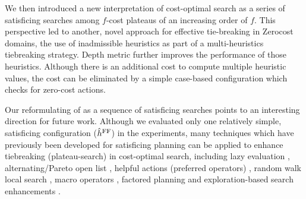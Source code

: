 We then introduced a new interpretation of cost-optimal \astar search as a series of satisficing
       searches among $f$-cost plateaus of an increasing order of $f$. 
This perspective led to another, novel approach for effective tie-breaking in Zerocost domains, the use of
       inadmissible heuristics as part of a multi-heuristics tiebreaking strategy.
       Depth metric further improves the performance of those
       heuristics. Although there is an additional cost to compute
       multiple heuristic values, the cost can be eliminated by a simple
       case-based configuration which checks for zero-cost actions.

Our reformulating of \astar as a sequence of satisficing searches  points to  an interesting direction for future work.
Although we evaluated only one relatively simple, satisficing configuration ($\hat{h}^{\text{FF}}$) in
the experiments, many techniques which have previously been developed for satisficing planning can be applied to enhance tiebreaking (plateau-search) in cost-optimal search, including
lazy evaluation \cite{richter2010lama}, alternating/Pareto open
list \cite{RogerH10}, helpful actions (preferred operators) \cite{Hoffmann01},
random walk local search \cite{nakhost2009monte}, macro operators
\cite{Botea2005,ChrpaVM15}, factored planning
\cite{amir2003factored,brafman2006factored,Asai2015} and
exploration-based search enhancements
\cite{valenzano2014comparison,xie14type,Valenzano2016}.

